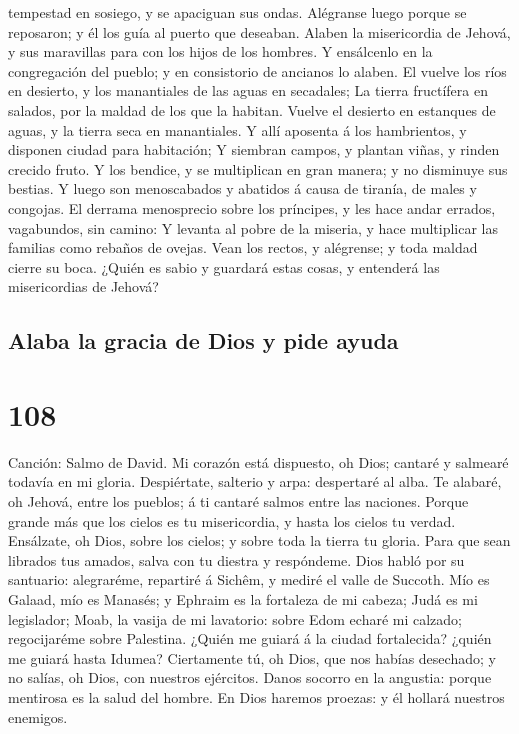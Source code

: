 tempestad en sosiego, y se apaciguan sus ondas. 
Alégranse luego porque se reposaron; y él los guía al puerto que
deseaban.  Alaben la misericordia de Jehová, y sus
maravillas para con los hijos de los hombres.  Y
ensálcenlo en la congregación del pueblo; y en consistorio de ancianos
lo alaben.  El vuelve los ríos en desierto, y los
manantiales de las aguas en secadales;  La tierra
fructífera en salados, por la maldad de los que la habitan.
 Vuelve el desierto en estanques de aguas, y la tierra
seca en manantiales.  Y allí aposenta á los hambrientos,
y disponen ciudad para habitación;  Y siembran campos, y
plantan viñas, y rinden crecido fruto.  Y los bendice, y
se multiplican en gran manera; y no disminuye sus bestias.
 Y luego son menoscabados y abatidos á causa de tiranía,
de males y congojas.  El derrama menosprecio sobre los
príncipes, y les hace andar errados, vagabundos, sin camino:
 Y levanta al pobre de la miseria, y hace multiplicar las
familias como rebaños de ovejas.  Vean los rectos, y
alégrense; y toda maldad cierre su boca.  ¿Quién es sabio
y guardará estas cosas, y entenderá las misericordias de Jehová?

\hypertarget{alaba-la-gracia-de-dios-y-pide-ayuda}{%
\subsection{Alaba la gracia de Dios y pide
ayuda}\label{alaba-la-gracia-de-dios-y-pide-ayuda}}

\hypertarget{section-107}{%
\section{108}\label{section-107}}

 Canción: Salmo de David. Mi corazón está dispuesto, oh
Dios; cantaré y salmearé todavía en mi gloria. 
Despiértate, salterio y arpa: despertaré al alba.  Te
alabaré, oh Jehová, entre los pueblos; á ti cantaré salmos entre las
naciones.  Porque grande más que los cielos es tu
misericordia, y hasta los cielos tu verdad.  Ensálzate, oh
Dios, sobre los cielos; y sobre toda la tierra tu gloria. 
Para que sean librados tus amados, salva con tu diestra y respóndeme.
 Dios habló por su santuario: alegraréme, repartiré á
Sichêm, y mediré el valle de Succoth.  Mío es Galaad, mío
es Manasés; y Ephraim es la fortaleza de mi cabeza; Judá es mi
legislador;  Moab, la vasija de mi lavatorio: sobre Edom
echaré mi calzado; regocijaréme sobre Palestina.  ¿Quién
me guiará á la ciudad fortalecida? ¿quién me guiará hasta Idumea?
 Ciertamente tú, oh Dios, que nos habías desechado; y no
salías, oh Dios, con nuestros ejércitos.  Danos socorro
en la angustia: porque mentirosa es la salud del hombre. 
En Dios haremos proezas: y él hollará nuestros enemigos.

